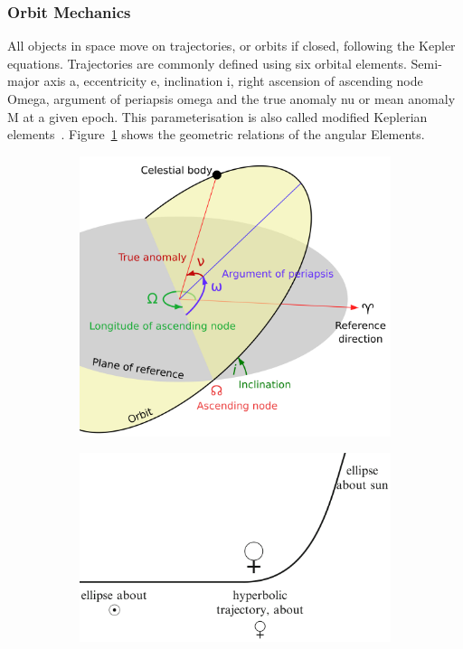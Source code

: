 \subsubsection{Orbit Mechanics} \label{sec:orbit_mechanics}
All objects in space move on trajectories, or orbits if closed, following the Kepler equations. Trajectories are commonly defined using six orbital elements.
Semi-major axis \gls{a}, eccentricity \gls{e}, inclination \gls{i}, right ascension of ascending node \gls{Omega}, argument of periapsis \gls{omega} and the true anomaly \gls{nu} or mean anomaly \gls{M} at a given epoch. This parameterisation is also called modified Keplerian elements~\cite{Hintz2015FundamentalsAstrodynamics}. Figure~\ref{fig:kepler_elements} shows the geometric relations of the angular Elements.
\begin{figure}[htb]
    \centering
    \begin{subfigure}[b]{0.47\textwidth}
        \includegraphics[width=.8\textwidth]{doc/thesis/0_figures/Orbit_elements.png}
        \caption{}
        \label{fig:kepler_elements}
    \end{subfigure}
    \begin{subfigure}[b]{0.47\textwidth}
        \centering
        \includegraphics[width=\textwidth]{doc/thesis/0_figures/Hyperbolic_trajectory.png}

\end{subfigure}
\end{figure}
